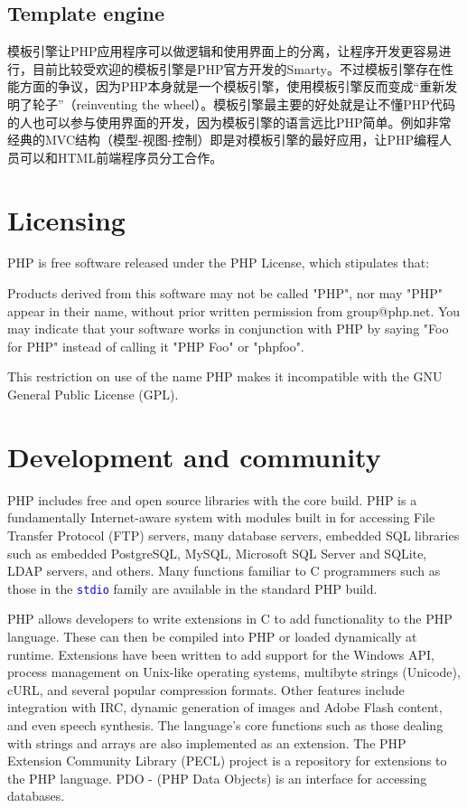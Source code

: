 \section{Template engine}

模板引擎让PHP应用程序可以做逻辑和使用界面上的分离，让程序开发更容易进行，目前比较受欢迎的模板引擎是PHP官方开发的Smarty。不过模板引擎存在性能方面的争议，因为PHP本身就是一个模板引擎，使用模板引擎反而变成“重新发明了轮子”（reinventing the wheel）。模板引擎最主要的好处就是让不懂PHP代码的人也可以参与使用界面的开发，因为模板引擎的语言远比PHP简单。例如非常经典的MVC结构（模型-视图-控制）即是对模板引擎的最好应用，让PHP编程人员可以和HTML前端程序员分工合作。




\chapter{Licensing}

PHP is free software released under the PHP License, which stipulates that:

Products derived from this software may not be called "PHP", nor may "PHP" appear in their name, without prior written permission from group@php.net. You may indicate that your software works in conjunction with PHP by saying "Foo for PHP" instead of calling it "PHP Foo" or "phpfoo".


This restriction on use of the name PHP makes it incompatible with the GNU General Public License (GPL).





\chapter{Development and community}

PHP includes free and open source libraries with the core build. PHP is a fundamentally Internet-aware system with modules built in for accessing File Transfer Protocol (FTP) servers, many database servers, embedded SQL libraries such as embedded PostgreSQL, MySQL, Microsoft SQL Server and SQLite, LDAP servers, and others. Many functions familiar to C programmers such as those in the \textcolor{Blue}{\texttt{stdio}} family are available in the standard PHP build.


PHP allows developers to write extensions in C to add functionality to the PHP language. These can then be compiled into PHP or loaded dynamically at runtime. Extensions have been written to add support for the Windows API, process management on Unix-like operating systems, multibyte strings (Unicode), cURL, and several popular compression formats. Other features include integration with IRC, dynamic generation of images and Adobe Flash content, and even speech synthesis. The language's core functions such as those dealing with strings and arrays are also implemented as an extension. The PHP Extension Community Library (PECL) project is a repository for extensions to the PHP language. PDO - (PHP Data Objects) is an interface for accessing databases.

